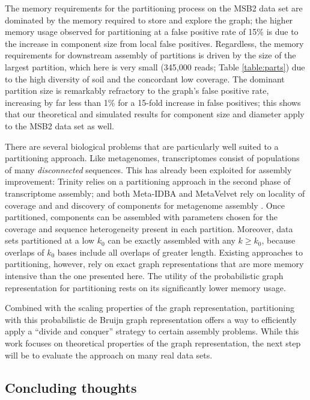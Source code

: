 \documentclass{pnastwo}
\begin{document}
\begin{article}
The memory requirements for the partitioning process on the MSB2 data
set are dominated by the memory required to store and explore the
graph; the higher memory usage observed for partitioning at a false positive rate
of 15\% is due to the increase in component size from local false
positives.  Regardless, the memory requirements for downstream assembly
of partitions is driven by the size of the largest partition, which
here is very small (345,000 reads; Table \ref{table:parts}) due to the
high diversity of soil and the concordant low coverage.  The
dominant partition size is remarkably refractory to the graph's false
positive rate, increasing by far less than 1\% for a 15-fold increase
in false positives; this shows that our theoretical and
simulated results for component size and diameter apply to the MSB2 data set
as well.


There are several biological problems that are particularly well
suited to a partitioning approach.  Like metagenomes, transcriptomes
consist of populations of many {\em disconnected} sequences.  This has
already been exploited for assembly improvement: Trinity relies on a
partitioning approach in the second phase of transcriptome assembly;
and both Meta-IDBA and MetaVelvet rely on locality of coverage and and
discovery of components for metagenome assembly
\cite{trinity,pubmed21685107,metavelvet}.  Once partitioned, components
can be assembled with parameters chosen for the coverage and sequence
heterogeneity present in each partition.  Moreover, data sets partitioned
at a low $k_0$ can be exactly assembled with any $k \ge k_0$, because
overlaps of $k_0$ bases include all overlaps of greater length.
Existing approaches to partitioning, however,
rely on exact graph representations that are more memory intensive
than the one presented here.  The utility of the probabilistic graph
representation for partitioning rests on its significantly lower
memory usage.

Combined with the scaling
properties of the graph representation, partitioning with this probabilistic
de Bruijn graph representation offers a way to
efficiently apply a ``divide and conquer'' strategy to certain
assembly problems.  While this work focuses on theoretical properties
of the graph representation, the next step will be to evaluate the approach
on many real data sets.

\subsection{Concluding thoughts}


\end{article}
\end{document}
